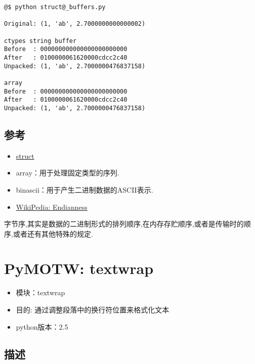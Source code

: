 \documentclass[letterpaper,10pt,english]{manual}
\begin{document}
\begin{Verbatim}[commandchars=@\[\]]
@$ python struct@_buffers.py

Original: (1, 'ab', 2.7000000000000002)

ctypes string buffer
Before  : 000000000000000000000000
After   : 0100000061620000cdcc2c40
Unpacked: (1, 'ab', 2.7000000476837158)

array
Before  : 000000000000000000000000
After   : 0100000061620000cdcc2c40
Unpacked: (1, 'ab', 2.7000000476837158)
\end{Verbatim}


\subsection{参考}
\begin{itemize}
\item {} 
\href{http://docs.python.org/library/struct.html}{struct}

\item {} 
array：用于处理固定类型的序列.

\item {} 
binascii：用于产生二进制数据的ASCII表示.

\item {} 
\href{http://en.wikipedia.org/wiki/Endianness}{WikiPedia: Endianness}

\end{itemize}

字节序,其实是数据的二进制形式的排列顺序,在内存存贮顺序,或者是传输时的顺序,或者还有其他特殊的规定.

\resetcurrentobjects


\section{PyMOTW: textwrap}
\begin{itemize}
\item {} 
模块：textwrap

\item {} 
目的: 通过调整段落中的换行符位置来格式化文本

\item {} 
python版本：2.5

\end{itemize}


\subsection{描述}
\end{document}
